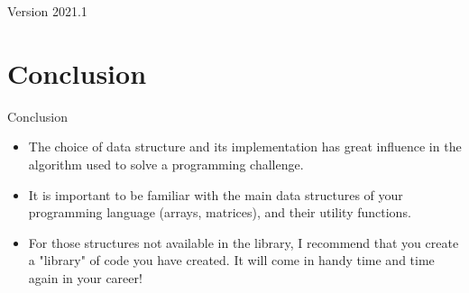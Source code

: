 \documentclass[aspectratio=169]{beamer}
\subtitle[Week 2]{Week 2 - Data Structures}
\date[]{{\smaller(last updated: \today)}}
\begin{document}
\begin{CJK}{UTF8}{ipxm}

\begin{frame}
\maketitle
\vfill

\hfill Version 2021.1
\end{frame}



% 



\section{Conclusion}
\begin{frame}{Conclusion}
  \begin{itemize}
    \item The choice of data structure and its implementation has great influence in the algorithm used to solve a programming challenge.
    \bigskip

    \item It is important to be familiar with the main data structures of your programming language (arrays, matrices), and their utility functions.\bigskip

    \item For those structures not available in the library, I recommend that you create a "library" of code you have created. It will come in handy time and time again in your career!
  \end{itemize}

\end{frame}


\end{CJK}
\end{document}
